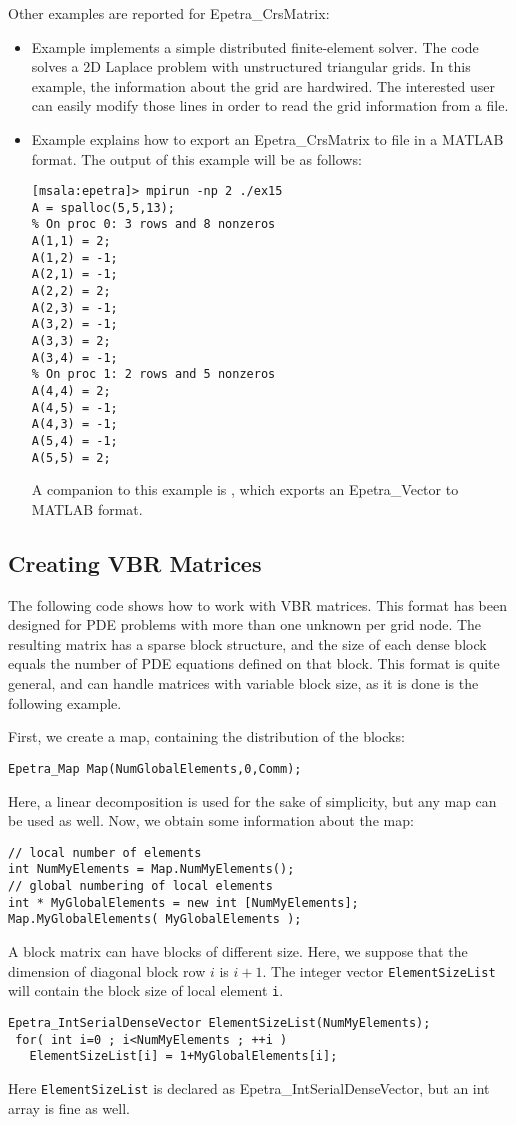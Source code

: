 Other examples are reported for Epetra\_CrsMatrix:
\begin{itemize}
\item Example  implements a simple distributed
  finite-element solver.  The code solves a 2D Laplace problem with
  unstructured triangular grids. In this example, the information about
  the grid are hardwired.  The interested user can easily modify those
  lines in order to read the grid information from a file.
\item Example  explains how to export an
  Epetra\_CrsMatrix to file in a MATLAB format.  The output of this
  example will be as follows:
\begin{verbatim}
[msala:epetra]> mpirun -np 2 ./ex15
A = spalloc(5,5,13);
% On proc 0: 3 rows and 8 nonzeros
A(1,1) = 2;
A(1,2) = -1;
A(2,1) = -1;
A(2,2) = 2;
A(2,3) = -1;
A(3,2) = -1;
A(3,3) = 2;
A(3,4) = -1;
% On proc 1: 2 rows and 5 nonzeros
A(4,4) = 2;
A(4,5) = -1;
A(4,3) = -1;
A(5,4) = -1;
A(5,5) = 2;
\end{verbatim}
  A companion to this
  example is \newline {}, which exports an Epetra\_Vector to
  MATLAB format.
\end{itemize}

\subsection{Creating VBR Matrices}
\label{sec:sparse_vbr}

The following code shows how to work with VBR matrices. This format has
been designed for PDE problems with more than one unknown per grid node.
The resulting matrix has a sparse block structure, and the size of each
dense block equals the number of PDE equations defined on that block.
This format is quite general, and can handle matrices with variable
block size, as it is done is the following example.

First, we create a map, containing the distribution of the blocks:
\begin{verbatim}
Epetra_Map Map(NumGlobalElements,0,Comm);
\end{verbatim}
Here, a linear decomposition is used for the sake of simplicity, but any
map can be used as well.
Now, we obtain some information about the map:
\begin{verbatim}
// local number of elements
int NumMyElements = Map.NumMyElements();
// global numbering of local elements
int * MyGlobalElements = new int [NumMyElements];
Map.MyGlobalElements( MyGlobalElements );
\end{verbatim}
A block matrix can have blocks of different size.  Here, we suppose that
the dimension of diagonal block row $i$ is $i+1$.  The integer vector
\verb!ElementSizeList! will contain the block size of local element
\verb!i!.
\begin{verbatim}
Epetra_IntSerialDenseVector ElementSizeList(NumMyElements);
 for( int i=0 ; i<NumMyElements ; ++i ) 
   ElementSizeList[i] = 1+MyGlobalElements[i];
\end{verbatim}
Here \verb!ElementSizeList! is declared as Epetra\_IntSerialDenseVector,
but an int array is fine as well.

